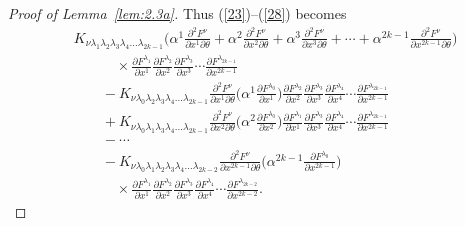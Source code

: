 \documentclass[10pt,a4paper]{amsart}
\numberwithin{equation}{section}
\theoremstyle{definition}
\begin{document}
\begin{proof}[Proof of Lemma~\ref{lem:2.3a}]
Thus (\ref{23})--(\ref{28}) becomes
\begin{align}
&K_{\nu\lambda_1\lambda_2\lambda_3\lambda_4\dots\lambda_{2k-1}}\biggl(\alpha^1 \frac{\partial^2F^\nu}{\partial x^1\partial\theta}+ \alpha^2 \frac{\partial^2F^\nu}{\partial x^2\partial\theta}
+\alpha^3 \frac{\partial^2F^\nu}{\partial x^3\partial\theta} +\cdots
+\alpha^{2k-1} \frac{\partial^2F^\nu}{\partial x^{2k-1}\partial\theta}
\biggr)\nonumber\\
&\quad\qquad{} \times \frac{\partial F^{\lambda_1}}{\partial x^1}\frac{\partial F^{\lambda_2}}{\partial x^2}
\frac{\partial F^{\lambda_3}}{\partial x^3}
\cdots\frac{\partial F^{\lambda_{2k-1}}}{\partial x^{2k-1}}\label{29}\\
&\qquad{}-K_{\nu\lambda_0\lambda_2\lambda_3\lambda_4\dots \lambda_{2k-1}}\frac{\partial^2F^\nu}{\partial x^1\partial\theta}
\biggl( \alpha^1\frac{\partial F^{\lambda_0}}{\partial x^1}\biggr)
\frac{\partial F^{\lambda_2}}{\partial x^2}
\frac{\partial F^{\lambda_3}}{\partial x^3}\frac{\partial F^{\lambda_4}}{\partial x^4}\cdots
\frac{\partial F^{\lambda_{2k-1}}}{\partial x^{2k-1}}
\label{30}\\
&\qquad{} + K_{\nu\lambda_0\lambda_1\lambda_3\lambda_4\dots\lambda_{2k-1}}\frac{\partial^2F^\nu}{\partial x^2\partial\theta}
\biggl( \alpha^2\frac{\partial F^{\lambda_0}}{\partial x^2}\biggr)
\frac{\partial F^{\lambda_1}}{\partial x^1}\frac{\partial F^{\lambda_3}}{\partial x^3}
\frac{\partial F^{\lambda_4}}{\partial x^4}\cdots \frac{\partial F^{\lambda_{2k-1}}}{\partial x^{2k-1}}
\label{31}\\
&\qquad -\cdots\nonumber\\
&\qquad{} - K_{\nu\lambda_0\lambda_1\lambda_2\lambda_3\lambda_4\dots\lambda_{2k-2}}\frac{\partial^2F^\nu}{\partial x^{2k-1}\partial\theta}
\biggl( \alpha^{2k-1}\frac{\partial F^{\lambda_0}}{\partial x^{2k-1}}\biggr)\nonumber\\
&\quad\qquad{}\times
\frac{\partial F^{\lambda_1}}{\partial x^1}\frac{\partial F^{\lambda_2}}{\partial x^2}
\frac{\partial F^{\lambda_3}}{\partial x^3}\frac{\partial F^{\lambda_4}}{\partial x^4}\cdots
\frac{\partial F^{\lambda_{2k-2}}}{\partial x^{2k-2}}.
\label{34}
\end{align}


\end{proof}
\end{document}
